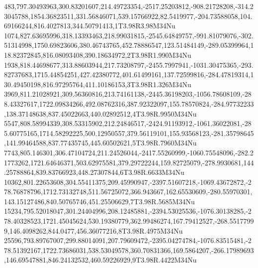 483,797.30493963,300.83201607,214.49723354,-2517.25203812,-908.21728208,-314.23045788,1854.36823511,331.56846071,539.15766922,82.5419977,-204.73588058,104.69166244,816.4027813,344.50791413,1T3.98R3.98M34Nu
1074,827.63695996,318.13393463,218.99031815,-2545.64849757,-991.81079076,-302.51314998,1750.69823606,380.46743765,452.78886547,123.51484149,-289.05399964,118.82372845,816.08093408,390.18634972,2T3.98R1.990M34Nu
1938,818.44698677,313.88603944,217.73208797,-2455.7997941,-1031.30475365,-293.82737683,1715.44854251,427.42380772,401.61499161,137.72599816,-284.47819314,130.49450198,816.97295764,411.10186153,3T3.98R1.326M34Nu
3969,811.21028921,309.56360816,213.74161138,-2445.36198203,-1056.78608109,-288.43327617,1722.09834266,492.08762316,387.92322097,155.78570824,-284.97732233,138.37148638,837.45022663,440.02892512,4T3.98R.9950M34Nu
5547,808.58994339,308.53315902,212.24846517,-2424.91193912,-1061.36022081,-285.60775165,1714.58292225,500.12950557,379.56119101,155.93568123,-281.35798645,141.99464588,837.77435745,445.60502621,5T3.98R.7960M34Nu
7743,805.146301,306.47104724,211.24526044,-2417.55260999,-1060.75548096,-282.21773262,1721.64646371,503.62975581,379.29722244,159.82725079,-278.9930681,144.25788864,839.83766923,448.27307844,6T3.98R.6633M34Nu
10362,801.22653608,304.55411375,209.45990947,-2397.51607218,-1069.43672872,-278.76878796,1712.73132748,511.56725072,366.943667,162.65530609,-280.55970301,143.15127486,840.50765746,451.25506629,7T3.98R.5685M34Nu
15234,795.52018047,301.24404996,208.12485881,-2394.53025536,-1076.30138285,-278.40328523,1721.45045624,530.19380779,362.99486274,167.79412527,-268.55177999,146.4098262,844.0477,456.36077216,8T3.98R.4975M34Nu
25596,793.89767007,299.88014091,207.79609472,-2395.04274784,-1076.83515481,-278.51392167,1722.73686031,538.53049578,360.70831366,169.5864207,-266.17989693,146.69547881,846.24132532,460.59226929,9T3.98R.4422M34Nu
